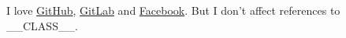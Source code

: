 I love \href{https://github.com/}{GitHub}, \href{https://gitlab.com/}{GitLab} and \href{https://facebook.com/}{Facebook}. But I don't affect references to __CLASS__.
